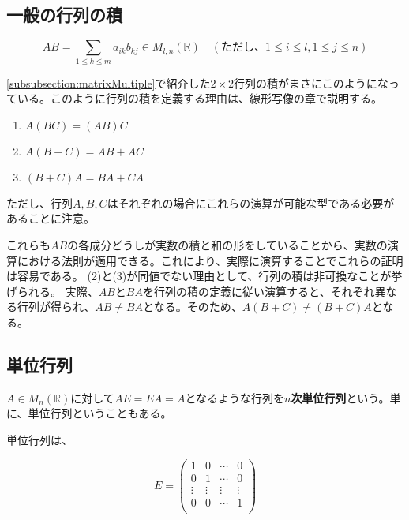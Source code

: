 \documentclass[dvipdfmx,autodetect-engine]{jsarticle}
\theoremstyle{definition}
\begin{document}
\subsection{一般の行列の積}

\label{defi:matrixMultiple}

$$
AB = \sum_{1 \leq k \leq m} a_{ik}b_{kj} \in M_{l, n}(\mathbb{R})
\quad (ただし、1 \leq i \leq l, 1 \leq j \leq n)
$$

\ref{subsubsection:matrixMultiple}で紹介した$2 \times 2$行列の積がまさにこのようになっている。このように行列の積を定義する理由は、線形写像の章で説明する。


\begin{enumerate}
\renewcommand{\labelenumi}{(\arabic{enumi})}
\item $A(BC) = (AB)C$
\item $A(B+C) = AB + AC$
\item $(B+C)A = BA + CA$
\end{enumerate}

ただし、行列$A, B, C$はそれぞれの場合にこれらの演算が可能な型である必要があることに注意。

これらも$AB$の各成分どうしが実数の積と和の形をしていることから、実数の演算における法則が適用できる。これにより、実際に演算することでこれらの証明は容易である。
(2)と(3)が同値でない理由として、行列の積は非可換なことが挙げられる。
実際、$AB$と$BA$を行列の積の定義に従い演算すると、それぞれ異なる行列が得られ、$AB \neq BA$となる。そのため、$A(B+C) \neq (B+C)A$となる。

\subsection{単位行列}


$A \in M_n(\mathbb{R})$に対して$AE = EA = A$となるような行列を{\bf $n$次単位行列}という。単に、単位行列ということもある。

単位行列は、

$$
E = \begin{pmatrix}
1 & 0 & \cdots & 0 \\
0 & 1 & \cdots & 0 \\
\vdots & \vdots & \vdots & \vdots \\
0 & 0 & \cdots & 1 \\
\end{pmatrix}
$$
\end{document}
